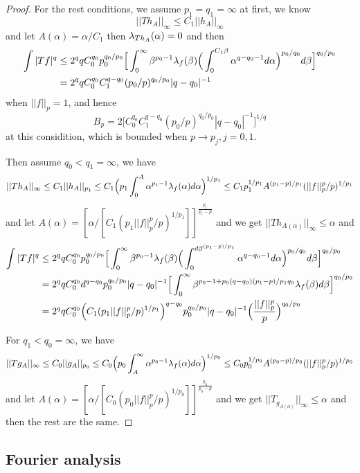 \begin{proof}
    For the rest conditions, we assume $p_1 = q_1 = \infty$ at first, we know
    \[
    ||Th_A||_{\infty} \leq C_1||h_A||_{\infty}
    \]
    and let $A(\alpha) = \alpha/C_1$ then $\lambda_{Th_A}(\alpha) = 0$ and then
    \[
    \begin{aligned}
    \int|Tf|^q &\leq 2^qq C_0^{q_0}p_0^{q_0/p_0}\Big[\int_0^{\infty}\beta^{p_0-1}\lambda_{f}(\beta)\Big(\int_0^{C_1\beta} \alpha^{q-q_0-1}d\alpha\Big)^{p_0/q_0}d\beta\Big]^{q_0/p_0} \\
    &=2^qq C_0^{q_0}C_1^{q-q_0}(p_0/p)^{q_0/p_0}|q-q_0|^{-1}
    \end{aligned}
    \]
    when $||f||_p = 1$, and hence
    \[
    B_p = 2\Big[ C_0^{q_0}C_1^{q-q_0}(p_0/p)^{q_0/p_0}|q-q_0|^{-1}\Big]^{1/q}
    \]
    at this considition, which is bounded when $p\to p_j, j = 0,1$.\par
    Then assume $q_0 < q_1 = \infty$, we have
    \[||Th_A||_{\infty} \leq C_1||h_A||_{p_1} \leq C_1\Big(p_1\int_0^A \alpha^{p_1-1}\lambda_{f}(\alpha)d\alpha\Big)^{1/p_1} \leq C_1p_1^{1/p_1}A^{(p_1-p)/p_1}(||f||_p^p/p)^{1/p_1}\]
    and let $A(\alpha) = [\alpha/[C_1(p_1||f||_p^p/p)^{1/p_1}]]^{\tfrac{p_1}{p_1-p}}$ and we get $||Th_{A(\alpha)}||_{\infty} \leq \alpha$ and
    \[
    \begin{aligned}
    \int|Tf|^q &\leq 2^qq C_0^{q_0}p_0^{q_0/p_0}\Big[\int_0^{\infty}\beta^{p_0-1}\lambda_{f}(\beta)\Big(\int_0^{d\beta^{(p_1-p)/p_1}} \alpha^{q-q_0-1}d\alpha\Big)^{p_0/q_0}d\beta\Big]^{q_0/p_0} \\
    &=2^qq C_0^{q_0}d^{q-q_0}p_0^{q_0/p_0}|q-q_0|^{-1}\Big[\int_0^{\infty}\beta^{p_0-1+p_0(q-q_0)(p_1-p)/p_1q_0}\lambda_{f}(\beta)d\beta\Big]^{q_0/p_0} \\
    & = 2^qq C_0^{q_0}\Big(C_1(p_1||f||_p^p/p)^{1/p_1}\Big)^{q-q_0}p_0^{q_0/p_0}|q-q_0|^{-1}\Big(\dfrac{||f||_p^p}{p}\Big)^{q_0/p_0}
    \end{aligned}
    \]\par
    For $q_1 < q_0 = \infty$, we have
     \[||Tg_A||_{\infty} \leq C_0||g_A||_{p_0} \leq C_0\Big(p_0\int_A^{\infty} \alpha^{p_0-1}\lambda_{f}(\alpha)d\alpha\Big)^{1/p_0} \leq C_0p_0^{1/p_0}A^{(p_0-p)/p_0}(||f||_p^p/p)^{1/p_0}\]
    and let $A(\alpha) = [\alpha/[C_0(p_0||f||_p^p/p)^{1/p_0}]]^{\tfrac{p_0}{p_0-p}}$ and we get $||T_{g_{A(\alpha)}}||_{\infty} \leq \alpha$ and then the rest are the same.
\end{proof}

\newpage

\subsection*{Fourier analysis}


